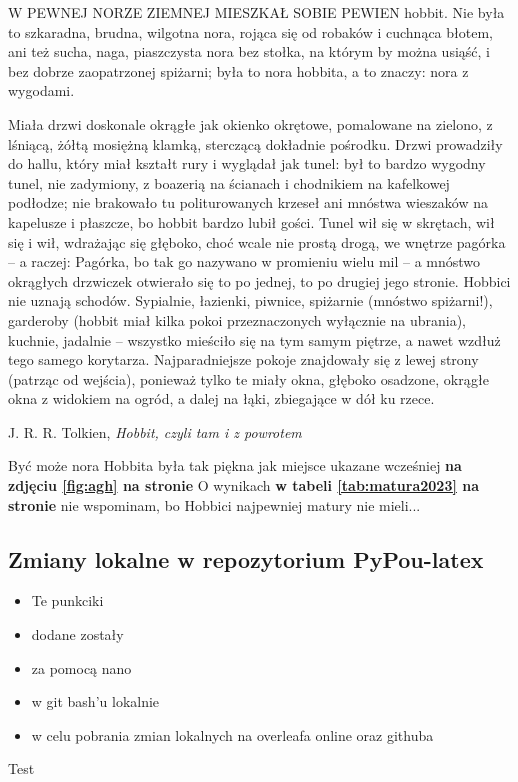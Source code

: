 \par
W PEWNEJ NORZE ZIEMNEJ MIESZKAŁ SOBIE PEWIEN hobbit. Nie była to szkaradna, brudna, wilgotna nora, rojąca się od robaków i cuchnąca błotem, ani też sucha, naga, piaszczysta nora bez stołka, na którym by można usiąść, i bez dobrze zaopatrzonej spiżarni; była to nora hobbita, a to znaczy: nora z wygodami.\par Miała drzwi doskonale okrągłe jak okienko okrętowe, pomalowane na zielono, z lśniącą, żółtą mosiężną klamką, sterczącą dokładnie pośrodku. Drzwi prowadziły do hallu, który miał kształt rury i wyglądał jak tunel: był to bardzo wygodny tunel, nie zadymiony, z boazerią na ścianach i chodnikiem na kafelkowej podłodze; nie brakowało tu politurowanych krzeseł ani mnóstwa wieszaków na kapelusze i płaszcze, bo hobbit bardzo lubił gości. Tunel wił się w skrętach, wił się i wił, wdrażając się głęboko, choć wcale nie prostą drogą, we wnętrze pagórka – a raczej: Pagórka, bo tak go nazywano w promieniu wielu mil – a mnóstwo okrągłych drzwiczek otwierało się to po jednej, to po drugiej jego stronie. Hobbici nie uznają schodów. Sypialnie, łazienki, piwnice, spiżarnie (mnóstwo spiżarni!), garderoby (hobbit miał kilka pokoi przeznaczonych wyłącznie na ubrania), kuchnie, jadalnie – wszystko mieściło się na tym samym piętrze, a nawet wzdłuż tego samego korytarza. Najparadniejsze pokoje znajdowały się z lewej strony (patrząc od wejścia), ponieważ tylko te miały okna, głęboko osadzone, okrągłe okna z widokiem na ogród, a dalej na łąki, zbiegające w dół ku rzece.\par
\begin{flushright}
J. R. R. Tolkien, \textit{Hobbit, czyli tam i z powrotem}
\end{flushright}
\par
\begingroup
    \centering
    Być może nora Hobbita była tak piękna jak miejsce ukazane wcześniej \textbf{na zdjęciu \ref{fig:agh} na stronie \pageref{fig:agh}} \Huge{\smiley{}} %
    \normalsize
    O wynikach \textbf{w tabeli \ref{tab:matura2023} na stronie \pageref{tab:matura2023}} nie wspominam, bo Hobbici najpewniej matury nie mieli... \Huge{\frownie{}}
\endgroup
\subsection{Zmiany lokalne w repozytorium PyPou-latex}
\begin{itemize}
	\item Te punkciki
	\item dodane zostały
	\item za pomocą nano
	\item w git bash'u lokalnie
	\item w celu pobrania zmian lokalnych na overleafa online oraz githuba 
\end{itemize}
Test
\newpage
